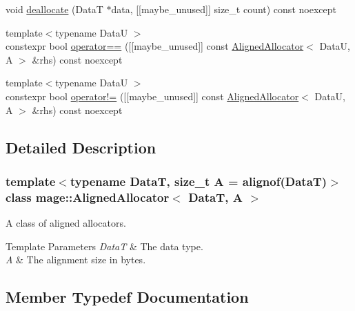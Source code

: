 \begin{DoxyCompactItemize}
\item 
void \mbox{\hyperlink{classmage_1_1_aligned_allocator_ab20cfc5d80d874b86c2716314bc5a63a}{deallocate}} (DataT $\ast$data, \mbox{[}\mbox{[}maybe\+\_\+unused\mbox{]}\mbox{]} size\+\_\+t count) const noexcept
\item 
{\footnotesize template$<$typename DataU $>$ }\\constexpr bool \mbox{\hyperlink{classmage_1_1_aligned_allocator_a64bb29ac780fd5ebdf62f11ab811bff5}{operator==}} (\mbox{[}\mbox{[}maybe\+\_\+unused\mbox{]}\mbox{]} const \mbox{\hyperlink{classmage_1_1_aligned_allocator}{Aligned\+Allocator}}$<$ DataU, A $>$ \&rhs) const noexcept
\item 
{\footnotesize template$<$typename DataU $>$ }\\constexpr bool \mbox{\hyperlink{classmage_1_1_aligned_allocator_a5bb7bae2944e1c97be57852178cf2930}{operator!=}} (\mbox{[}\mbox{[}maybe\+\_\+unused\mbox{]}\mbox{]} const \mbox{\hyperlink{classmage_1_1_aligned_allocator}{Aligned\+Allocator}}$<$ DataU, A $>$ \&rhs) const noexcept
\end{DoxyCompactItemize}


\subsection{Detailed Description}
\subsubsection*{template$<$typename DataT, size\+\_\+t A = alignof(\+Data\+T)$>$\newline
class mage\+::\+Aligned\+Allocator$<$ Data\+T, A $>$}

A class of aligned allocators.


\begin{DoxyTemplParams}{Template Parameters}
{\em DataT} & The data type. \\
\hline
{\em A} & The alignment size in bytes. \\
\hline
\end{DoxyTemplParams}


\subsection{Member Typedef Documentation}
\mbox{\label{classmage_1_1_aligned_allocator_a8e5be98ed33a6dd84f72b75ee07753e7}} 

